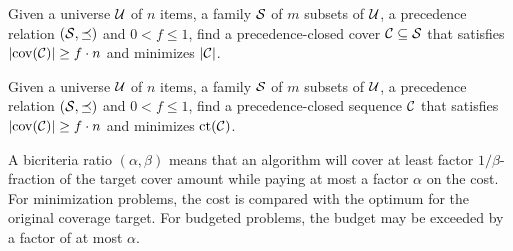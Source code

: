 \begin{problem} \label{problem:PCSC}
Given a universe $\mathcal{U}$ of $n$ items, a family $\mathcal{S}$ of $m$ subsets of $\mathcal{U}$, a precedence relation $(\mathcal{S},\preceq)$ and $0<f\leq 1$, find a precedence-closed cover $\mathcal{C}\subseteq\mathcal{S}$ that satisfies $\mathopen{}\left| \operatorname{cov}\mathopen{}\left( \mathcal{C} \right) \right|\geq f\cdot n$ and minimizes $\mathopen{}\left| \mathcal{C} \right|$.
\end{problem}
\begin{problem} \label{problem:PCMSSC}
Given a universe $\mathcal{U}$ of $n$ items, a family $\mathcal{S}$ of $m$ subsets of $\mathcal{U}$, a precedence relation $(\mathcal{S},\preceq)$ and $0<f\leq 1$, find a precedence-closed sequence $\mathcal{C}$ that satisfies $\mathopen{}\left| \operatorname{cov}\mathopen{}\left( \mathcal{C} \right) \right|\geq f\cdot n$ and minimizes $\operatorname{ct}\mathopen{}\left( \mathcal{C} \right)$.
\end{problem}

A bicriteria ratio $(\alpha,\beta)$ means that an algorithm will cover at least factor $1/\beta$-fraction of the target cover amount while paying at most a factor $\alpha$ on the cost. For minimization problems, the cost is compared with the optimum for the original coverage target. For budgeted problems, the budget may be exceeded by a factor of at most $\alpha$.

